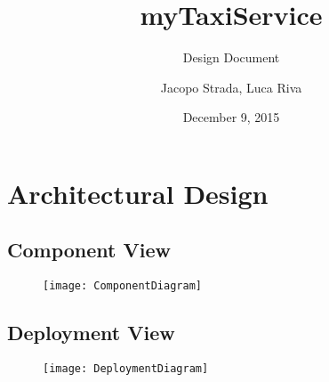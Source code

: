 \documentclass[9pt]{beamer}
\title{myTaxiService}
\subtitle{Design Document}
\author{Jacopo Strada, Luca Riva}
\date{December 9, 2015}
\makeatletter
\newcommand*{\currentname}{\@currentlabelname}
\makeatother
\begin{document}
\maketitle

\section{Architectural Design}
\subsection{Component View}
\begin{frame}{\currentname}

\begin{figure}[H]
\texttt{[image: ComponentDiagram]}
\centering
\end{figure}

\end{frame}

\subsection{Deployment View}
\begin{frame}{\currentname}

\begin{figure}[H]
\texttt{[image: DeploymentDiagram]}
\centering
\end{figure}

\end{frame}
\end{document}
